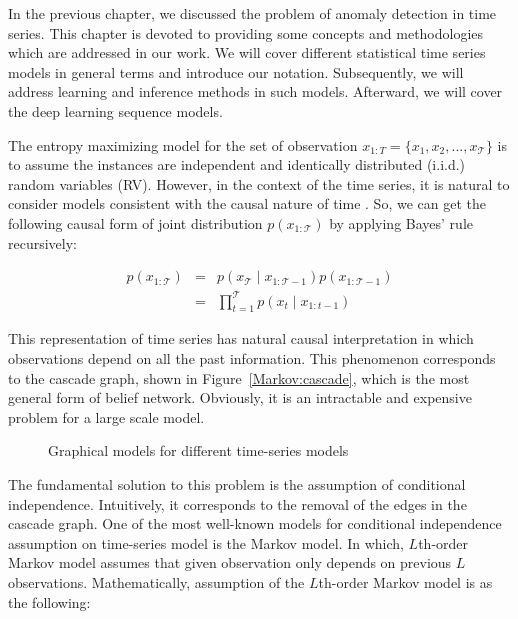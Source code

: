 In the previous chapter, we discussed the problem of anomaly detection in time series.
This chapter is devoted to providing some concepts and methodologies which are addressed in our work. 
We will cover different statistical time series models in general terms and introduce our notation. 
Subsequently, we will address learning and inference methods in such models.
Afterward, we will cover the deep learning sequence models.

The entropy maximizing model for the set of observation $x_{1:T}=\{x_1, x_2, ..., x_{\mathcal{T}}\}$ is to assume the instances are independent and identically distributed (i.i.d.) random variables (RV)\cite{hoadley1971asymptotic}. 
However, in the context of the time series, it is natural to consider models consistent with the causal nature of time \cite{barber2010graphical}. 
So, we can get the following causal form of joint distribution $p(x_{1:\mathcal{T}})$ by applying Bayes' rule recursively:

\begin{eqnarray}
    p\left(x_{1 : \mathcal{T}}\right) & = & p\left(x_{\mathcal{T}} \mid x_{1 : \mathcal{T}-1}\right) p\left(x_{1 : \mathcal{T}-1}\right) \\
    & = & \prod_{t=1}^{\mathcal{T}} p\left(x_{t} \mid x_{1 : t-1}\right)
\end{eqnarray}

This representation of time series has natural causal interpretation in which observations depend on all the past information. 
This phenomenon corresponds to the cascade graph, shown in Figure~\ref{Markov:cascade}, which is the most general form of belief network. 
Obviously, it is an intractable and expensive problem for a large scale model.

\begin{figure}
\centering
    
    
    \caption{Graphical models for different time-series models}
    \label{Markov}
\end{figure}

The fundamental solution to this problem is the assumption of conditional independence. 
Intuitively, it corresponds to the removal of the edges in the cascade graph. 
One of the most well-known models for conditional independence assumption on time-series model is the Markov model. 
In which, $L$th-order Markov model assumes that given observation only depends on previous $L$ observations. 
Mathematically, assumption of the $L$th-order Markov model is as the following:

